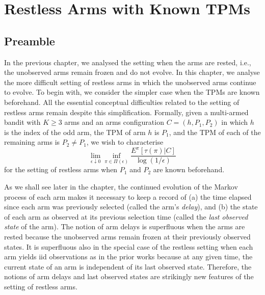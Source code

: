 \chapter{Restless Arms with Known TPMs}
\label{ch:restless_with_known_TPMs}

\section{Preamble}
In the previous chapter, we analysed the setting when the arms are rested, i.e., the unobserved arms remain frozen and do not evolve. In this chapter, we analyse the more difficult setting of restless arms in which the unobserved arms continue to evolve.  To begin with, we consider the simpler case when the TPMs are known beforehand. All the essential conceptual difficulties related to the setting of restless arms remain despite this simplification. Formally, given a multi-armed bandit with $K\geq 3$ arms and an arms configuration $C=(h, P_{1}, P_{2})$ in which $h$ is the index of the odd arm, the TPM of arm $h$ is $P_{1}$, and the TPM of each of the remaining arms is $P_{2}\neq P_{1}$, we wish to characterise $$ \lim\limits_{\epsilon\downarrow 0}  \inf\limits_{\pi\in \Pi(\epsilon)} \frac{E^{\pi}[\tau(\pi)|C]}{\log (1/\epsilon)} $$ for the setting of restless arms when $P_{1}$ and $P_{2}$ are known beforehand.

As we shall see later in the chapter, the continued evolution of the Markov process of each arm makes it necessary to keep a record of (a) the time elapsed since each arm was previously selected (called the arm's \emph{delay}), and (b) the state of each arm as observed at its previous selection time (called the \emph{last observed state} of the arm). The notion of arm delays is superfluous when the arms are rested because the unobserved arms remain frozen at their previously observed states. It is superfluous also in the special case of the restless setting when each arm yields iid observations as in the prior works \cite{Vaidhiyan2017, vaidhiyan2012active, vaidhiyan2017learning, prabhu2017learning} because at any given time, the current state of an arm is independent of its last observed state. Therefore, the notions of arm delays and last observed states are strikingly new features of the setting of restless arms. 

